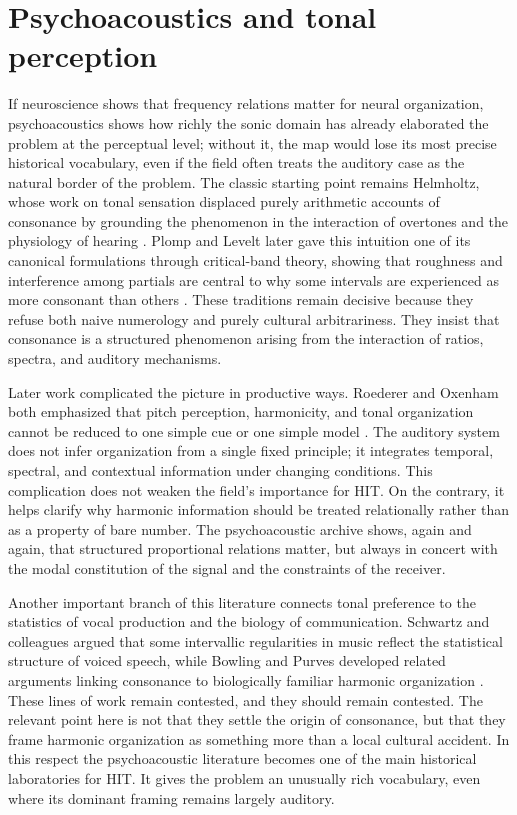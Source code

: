 \section{Psychoacoustics and tonal perception}

If neuroscience shows that frequency relations matter for neural organization, psychoacoustics shows how richly the sonic domain has already elaborated the problem at the perceptual level; without it, the map would lose its most precise historical vocabulary, even if the field often treats the auditory case as the natural border of the problem. The classic starting point remains Helmholtz, whose work on tonal sensation displaced purely arithmetic accounts of consonance by grounding the phenomenon in the interaction of overtones and the physiology of hearing \parencite{helmholtz_1863}. Plomp and Levelt later gave this intuition one of its canonical formulations through critical-band theory, showing that roughness and interference among partials are central to why some intervals are experienced as more consonant than others \parencite{plomp_1965}. These traditions remain decisive because they refuse both naive numerology and purely cultural arbitrariness. They insist that consonance is a structured phenomenon arising from the interaction of ratios, spectra, and auditory mechanisms.

Later work complicated the picture in productive ways. Roederer and Oxenham both emphasized that pitch perception, harmonicity, and tonal organization cannot be reduced to one simple cue or one simple model \parencite{roederer_2008, oxenham_2012}. The auditory system does not infer organization from a single fixed principle; it integrates temporal, spectral, and contextual information under changing conditions. This complication does not weaken the field's importance for HIT. On the contrary, it helps clarify why harmonic information should be treated relationally rather than as a property of bare number. The psychoacoustic archive shows, again and again, that structured proportional relations matter, but always in concert with the modal constitution of the signal and the constraints of the receiver.

Another important branch of this literature connects tonal preference to the statistics of vocal production and the biology of communication. Schwartz and colleagues argued that some intervallic regularities in music reflect the statistical structure of voiced speech, while Bowling and Purves developed related arguments linking consonance to biologically familiar harmonic organization \parencite{schwartz_2003, bowling_2015}. These lines of work remain contested, and they should remain contested. The relevant point here is not that they settle the origin of consonance, but that they frame harmonic organization as something more than a local cultural accident. In this respect the psychoacoustic literature becomes one of the main historical laboratories for HIT. It gives the problem an unusually rich vocabulary, even where its dominant framing remains largely auditory.

